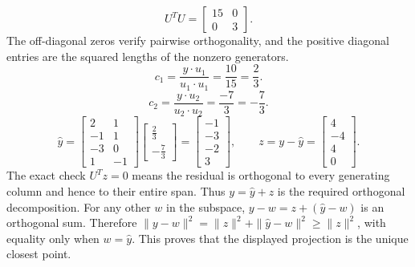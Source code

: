 \[U^TU=\left[\begin{array}{rr}15&0\\0&3\end{array}\right].\]
The off-diagonal zeros verify pairwise orthogonality, and the positive diagonal entries are the squared lengths of the nonzero generators.
\[c_{1}=\frac{y\cdot u_{1}}{u_{1}\cdot u_{1}}=\frac{10}{15}=\frac{2}{3}.\]
\[c_{2}=\frac{y\cdot u_{2}}{u_{2}\cdot u_{2}}=\frac{-7}{3}=- \frac{7}{3}.\]
\[\widehat y=\left[\begin{array}{rr}2&1\\-1&1\\-3&0\\1&-1\end{array}\right]\left[\begin{array}{r}\frac{2}{3}\\- \frac{7}{3}\end{array}\right]=\left[\begin{array}{r}-1\\-3\\-2\\3\end{array}\right],\qquad z=y-\widehat y=\left[\begin{array}{r}4\\-4\\4\\0\end{array}\right].\]
The exact check $U^Tz=0$ means the residual is orthogonal to every generating column and hence to their entire span. Thus $y=\widehat y+z$ is the required orthogonal decomposition.
For any other $w$ in the subspace, $y-w=z+(\widehat y-w)$ is an orthogonal sum. Therefore $\|y-w\|^2=\|z\|^2+\|\widehat y-w\|^2\ge\|z\|^2$, with equality only when $w=\widehat y$. This proves that the displayed projection is the unique closest point.


